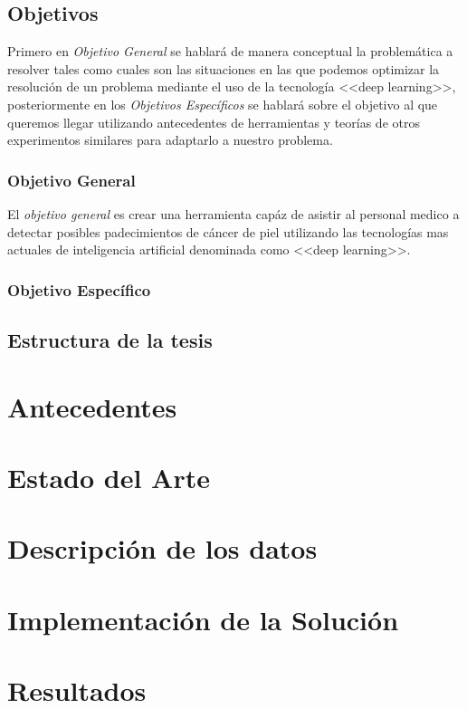\section{Objetivos}
Primero en \emph{Objetivo General} se hablará de manera conceptual la problemática a resolver tales como cuales son las situaciones en las que podemos optimizar la resolución de un problema mediante el uso de la tecnología <<deep learning>>, posteriormente en los \emph{Objetivos Específicos} se hablará sobre el objetivo al que queremos llegar utilizando antecedentes de herramientas y teorías de otros experimentos similares para adaptarlo a nuestro problema.

\subsection{Objetivo General}
El \emph{objetivo general} es crear una herramienta capáz de asistir al personal medico a detectar posibles padecimientos de cáncer de piel utilizando las tecnologías mas actuales de inteligencia artificial denominada como <<deep learning>>.


\subsection{Objetivo Específico}

\section{Estructura de la tesis}

\chapter{Antecedentes}

\chapter{Estado del Arte}

\chapter{Descripción de los datos}

\chapter{Implementación de la Solución}

\chapter{Resultados}

